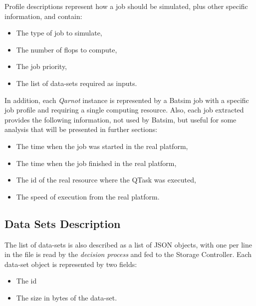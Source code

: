 Profile descriptions represent how a job should be simulated, plus other specific information, and contain: 
\begin{itemize}
    \item The type of job to simulate, 
    \item The number of flops to compute, 
    \item The job priority, 
    \item The list of data-sets required as inputs.
\end{itemize}
    
In addition, each \emph{Qarnot} instance is represented by a Batsim job with a specific job profile and requiring a single computing resource. Also, each job extracted provides the following information, not used by Batsim, but useful for some analysis that will be presented in further sections:

\begin{itemize}
    \item The time when the job was started in the real platform,
    \item The time when the job finished in the real platform,
    \item The id of the real resource where the QTask was executed,
    \item The speed of execution from the real platform.
\end{itemize}{}

\subsection{Data Sets Description} 

The list of data-sets is also described as a list of JSON objects, with one per line in the file is read by the \emph{decision process} and fed to the Storage Controller. Each data-set object is represented by two fields:

\begin{itemize}
    \item The id
    \item The size in bytes of the data-set.
\end{itemize}{}


